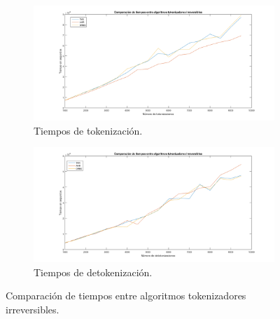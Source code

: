 \begin{figure}
  \centering
  \begin{subfigure}{1\textwidth}
    \begin{center}
      \includegraphics[width=1\linewidth]
        {../../../../../diagramas_comunes/desempenio/tok_irrev}
      \caption{Tiempos de tokenización.}
    \end{center}
  \end{subfigure}
  \begin{subfigure}{0.9\textwidth}
    \begin{center}
      \includegraphics[width=1\linewidth]{diagramas/detok_irrev}
      \caption{Tiempos de detokenización.}
    \end{center}
  \end{subfigure}
  \caption{Comparación de tiempos entre algoritmos tokenizadores irreversibles.}
  \label{figura:tok_irrev}
\end{figure}

